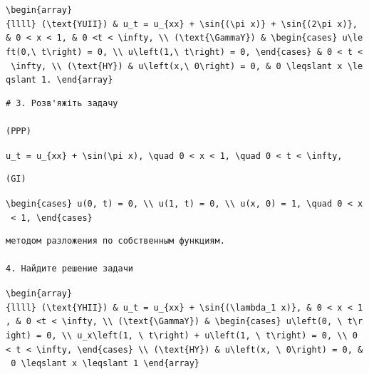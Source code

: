 \documentclass[
  ukrainian,
]{article}
\begin{document}
\texttt{\textbackslash{}begin\{array\}\{llll\}\ (\textbackslash{}text\{YUII\})\ \&\ u\_t\ =\ u\_\{xx\}\ +\ \textbackslash{}sin\{(\textbackslash{}pi\ x)\}\ +\ \textbackslash{}sin\{(2\textbackslash{}pi\ x)\},\ \&\ 0\ \textless{}\ x\ \textless{}\ 1,\ \&\ 0\ \textless{}t\ \textless{}\ \textbackslash{}infty,\ \textbackslash{}\textbackslash{}\ (\textbackslash{}text\{\textbackslash{}GammaY\})\ \&\ \textbackslash{}begin\{cases\}\ u\textbackslash{}left(0,\textbackslash{}\ t\textbackslash{}right)\ =\ 0,\ \textbackslash{}\textbackslash{}\ u\textbackslash{}left(1,\textbackslash{}\ t\textbackslash{}right)\ =\ 0,\ \textbackslash{}end\{cases\}\ \&\ 0\ \textless{}\ t\ \textless{}\ \textbackslash{}infty,\ \textbackslash{}\textbackslash{}\ (\textbackslash{}text\{HY\})\ \&\ u\textbackslash{}left(x,\textbackslash{}\ 0\textbackslash{}right)\ =\ 0,\ \&\ 0\ \textbackslash{}leqslant\ x\ \textbackslash{}leqslant\ 1.\ \textbackslash{}end\{array\}}

\begin{verbatim}
# 3. Розв'яжіть задачу

(PPP)
\end{verbatim}

\texttt{u\_t\ =\ u\_\{xx\}\ +\ \textbackslash{}sin(\textbackslash{}pi\ x),\ \textbackslash{}quad\ 0\ \textless{}\ x\ \textless{}\ 1,\ \textbackslash{}quad\ 0\ \textless{}\ t\ \textless{}\ \textbackslash{}infty,}

\begin{verbatim}
(GI)
\end{verbatim}

\texttt{\textbackslash{}begin\{cases\}\ u(0,\ t)\ =\ 0,\ \textbackslash{}\textbackslash{}\ u(1,\ t)\ =\ 0,\ \textbackslash{}\textbackslash{}\ u(x,\ 0)\ =\ 1,\ \textbackslash{}quad\ 0\ \textless{}\ x\ \textless{}\ 1,\ \textbackslash{}end\{cases\}}

\begin{verbatim}
методом разложения по собственным функциям.

4. Найдите решение задачи
\end{verbatim}

\texttt{\textbackslash{}begin\{array\}\{llll\}\ (\textbackslash{}text\{YHII\})\ \&\ u\_t\ =\ u\_\{xx\}\ +\ \textbackslash{}sin\{(\textbackslash{}lambda\_1\ x)\},\ \&\ 0\ \textless{}\ x\ \textless{}\ 1,\ \&\ 0\ \textless{}t\ \textless{}\ \textbackslash{}infty,\ \textbackslash{}\textbackslash{}\ (\textbackslash{}text\{\textbackslash{}GammaY\})\ \&\ \textbackslash{}begin\{cases\}\ u\textbackslash{}left(0,\ \textbackslash{}\ t\textbackslash{}right)\ =\ 0,\ \textbackslash{}\textbackslash{}\ u\_x\textbackslash{}left(1,\ \textbackslash{}\ t\textbackslash{}right)\ +\ u\textbackslash{}left(1,\ \textbackslash{}\ t\textbackslash{}right)\ =\ 0,\ \textbackslash{}\textbackslash{}\ 0\ \textless{}\ t\ \textless{}\ \textbackslash{}infty,\ \textbackslash{}end\{cases\}\ \textbackslash{}\textbackslash{}\ (\textbackslash{}text\{HY\})\ \&\ u\textbackslash{}left(x,\ \textbackslash{}\ 0\textbackslash{}right)\ =\ 0,\ \&\ 0\ \textbackslash{}leqslant\ x\ \textbackslash{}leqslant\ 1\ \textbackslash{}end\{array\}}
\end{document}
